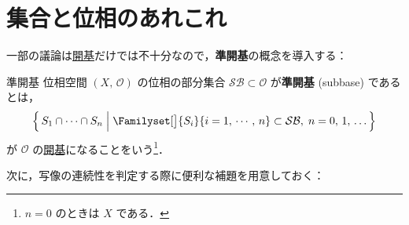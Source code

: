 \documentclass[geometry_main]{subfiles}
\begin{document}
\setcounter{chapter}{0}

\chapter{集合と位相のあれこれ}

一部の議論は\hyperref[def.opbase]{開基}だけでは不十分なので，\textbf{準開基}の概念を導入する：
\begin{mydef}[label=def:subbase]{準開基}
	位相空間 $(X,\, \mathscr{O})$ の位相の部分集合 $\mathcal{SB} \subset \mathscr{O}$ が\textbf{準開基} (subbase) であるとは，
    \begin{align}
        \Bigl\{\, S_1 \cap \cdots \cap S_n \Bigm| \Familyset[\big]{S_i}{i = 1,\, \cdots,\, n} \subset \mathcal{SB},\; n=0,\, 1,\, \dots \,\Bigr\}
    \end{align}
    が $\mathscr{O}$ の\hyperref[def.opbase]{開基}になることをいう\footnote{$n=0$ のときは $X$ である．}．
\end{mydef}
次に，写像の連続性を判定する際に便利な補題を用意しておく：
\end{document}
